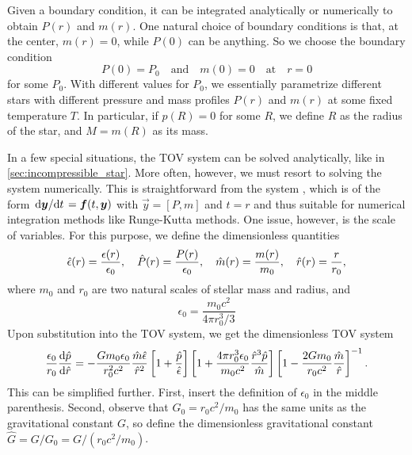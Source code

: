 Given a boundary condition, it can be integrated analytically or numerically to obtain $P(r)$ and $m(r)$.
One natural choice of boundary conditions is that, at the center, $m(r) = 0$, while $P(0)$ can be anything.
So we choose the boundary condition
\begin{equation}
	P(0) = P_0
	\quad \text{and} \quad
	m(0) = 0
	\quad \text{at} \quad
	r = 0
\end{equation}
for some $P_0$.
With different values for $P_0$, we essentially parametrize different stars with different pressure and mass profiles $P(r)$ and $m(r)$ at some fixed temperature $T$.
In particular, if $p(R) = 0$ for some $R$, we define $R$ as the radius of the star, and $M = m(R)$ as its mass.

In a few special situations, the TOV system can be solved analytically, like in \cref{sec:incompressible_star}.
More often, however, we must resort to solving the system numerically.
This is straightforward from the system , which is of the form $\odv{\vec{y}}/{t} = \vec{f}(t, \vec{y})$ with $\vec{y} = [P, m]$ and $t = r$ and thus suitable for numerical integration methods like Runge-Kutta methods.
One issue, however, is the scale of variables.
For this purpose, we define the dimensionless quantities
\begin{equation}
	\hat{\epsilon}(r) = \frac{\epsilon(r)}{\epsilon_0}, \quad
	\hat{P}(r) = \frac{P(r)}{\epsilon_0}, \quad
	\hat{m}(r) = \frac{m(r)}{m_0}, \quad
	\hat{r}(r) = \frac{r}{r_0},
\end{equation}
where $m_0$ and $r_0$ are two natural scales of stellar mass and radius, and
\begin{equation}
	\epsilon_0 = \frac{m_0 c^2}{4 \pi r_0^3 / 3}
\end{equation}
Upon substitution into the TOV system, we get the dimensionless TOV system
\begin{equation}
	\frac{\epsilon_0}{r_0} \odv{\diml{p}}{\diml{r}} = -\frac{G m_0 \epsilon_0}{r_0^2 c^2} \frac{\diml{m} \diml{\epsilon}}{\diml{r}^2} \left[ 1 + \frac{\diml{p}}{\diml{\epsilon}} \right] \left[ 1 + \frac{4 \pi r_0^3 \epsilon_0}{m_0 c^2} \frac{\diml{r}^3 \diml{p}}{\diml{m}} \right] \left[ 1 - \frac{2 G m_0}{r_0 c^2} \frac{\diml{m}}{\diml{r}} \right]^{-1}.
\end{equation}
This can be simplified further.
First, insert the definition of $\epsilon_0$ in the middle parenthesis.
Second, observe that $G_0 = r_0 c^2 / m_0$ has the same units as the gravitational constant $G$, so define the dimensionless gravitational constant $\hat{G} = G / G_0 = G / (r_0 c^2 / m_0)$.
